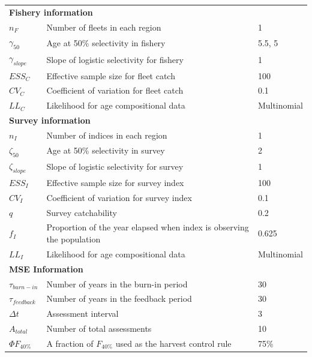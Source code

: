 \begin{center}
\begin{longtable}{p{2cm} p{10cm} p{2cm}}
\multicolumn{3}{l}{\textbf{Fishery information}} \tabularnewline
$n_{F}$ & Number of fleets in each region & 1 \tabularnewline
$\gamma_{50}$ & Age at 50\% selectivity in fishery & 5.5, 5 \tabularnewline
$\gamma_{slope} $ & Slope of logistic selectivity for fishery & 1 \tabularnewline
$ESS_{C}$ & Effective sample size for fleet catch & 100 \tabularnewline
$CV_{C}$ & Coefficient of variation for fleet catch & 0.1 \tabularnewline
$LL_{C}$ & Likelihood for age compositional data & Multinomial \tabularnewline

\multicolumn{3}{l}{\textbf{Survey information}} \tabularnewline
$n_{I}$ & Number of indices in each region & 1 \tabularnewline
$\zeta_{50}$ & Age at 50\% selectivity in survey & 2 \tabularnewline
$\zeta_{slope}$ & Slope of logistic selectivity for survey & 1 \tabularnewline
$ESS_{I}$ & Effective sample size for survey index & 100 \tabularnewline
$CV_{I}$ & Coefficient of variation for survey index & 0.1 \tabularnewline
$q$ & Survey catchability & 0.2 \tabularnewline
$f_{I}$ & Proportion of the year elapsed when index is observing the population & 0.625 \tabularnewline
$LL_{I}$ & Likelihood for age compositional data & Multinomial \tabularnewline

\multicolumn{3}{l}{\textbf{MSE Information}} \tabularnewline
$\tau_{burn-in}$ & Number of years in the burn-in period & 30 \tabularnewline
$\tau_{feedback}$ & Number of years in the feedback period & 30 \tabularnewline
$\Delta t$ & Assessment interval & 3 \tabularnewline
$A_{total}$ & Number of total assessments & 10 \tabularnewline
$\Phi F_{40\%}$ & A fraction of $F_{40\%}$ used as the harvest control rule & 75\% \tabularnewline

\hline
\end{longtable}
\end{center}
